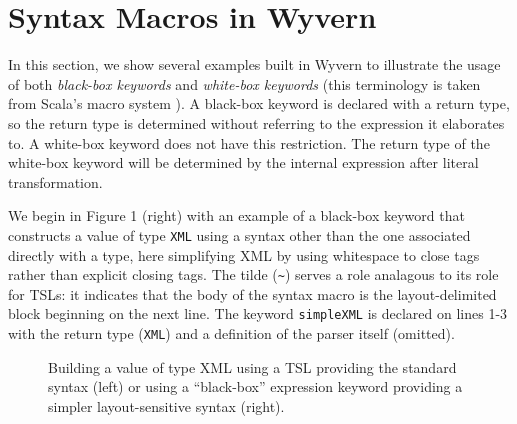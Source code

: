 \documentclass[letterpaper, notitlepage]{article}
\begin{document}
\section{Syntax Macros in Wyvern}
In this section, we show several examples built in Wyvern to illustrate the usage of both \emph{black-box keywords} and \emph{white-box keywords} (this terminology is taken from Scala's macro system \cite{ScalaMacros2013}). A black-box keyword is declared with a return type, so the return type is determined without referring to the expression it elaborates to. A white-box keyword does not have this restriction. The return type of the white-box keyword will be determined by the internal expression after literal transformation.

We begin in Figure 1 (right) with an example of a black-box keyword that constructs a value of type \verb|XML| using a syntax other than the one associated directly with a type, here simplifying XML by using whitespace to close tags rather than explicit closing tags. The tilde (\verb|~|) serves a role analagous to its role for TSLs: it indicates that the body of the syntax macro is the layout-delimited block beginning on the next line. The keyword \texttt{simpleXML} is declared on lines 1-3 with the return type (\texttt{XML}) and a definition of the parser itself (omitted).



\begin{figure*}[htb!]
\vspace{-15px}
\begin{parcolumns}{2}
\end{parcolumns}
\vspace{-15px}
\caption{Building a value of type XML using a TSL providing the standard syntax (left) or using a ``black-box'' expression keyword providing a simpler layout-sensitive syntax (right).}
\label{xml}
\vspace{-15px}
\end{figure*}
\end{document}
